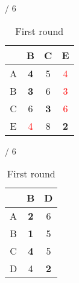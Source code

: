 \documentclass[a4paper, 11 pt, article, accentcolor=tud7b]{tudreport}
\begin{document}
\begin{table}[h]
\begin{subtable}[b]{\textwidth / 6}
\begin{tabular}{| c | c | c | c |}
	    \hline
	      & B                   & C           & E           \\ \hline
	    A & \textbf{4}          & 5           & \textcolor{red}{4} \\ \hline
	    B & \textbf{3}          & 6           & \textcolor{red}{3} \\ \hline
	    C & 6                   & \textbf{3}  & \textcolor{red}{6} \\ \hline
	    E & \textcolor{red}{4}  & 8           & \textbf{2}  \\ \hline
	    \end{tabular}
	    \caption{$D^{D}$}
	  \end{subtable}
	  \hfill
	  \begin{subtable}[b]{\textwidth / 6}
	    \begin{tabular}{| c | c | c |}
	    \hline
	      & B          & D           \\ \hline
	    A & \textbf{2} & 6           \\ \hline
	    B & \textbf{1} & 5           \\ \hline
	    C & \textbf{4} & 5           \\ \hline
	    D & 4          & \textbf{2}  \\ \hline
	    \end{tabular}
	    \caption{$D^{E}$}
	  \end{subtable}
	  \caption{First round}
	\end{table}
	
\end{document}
